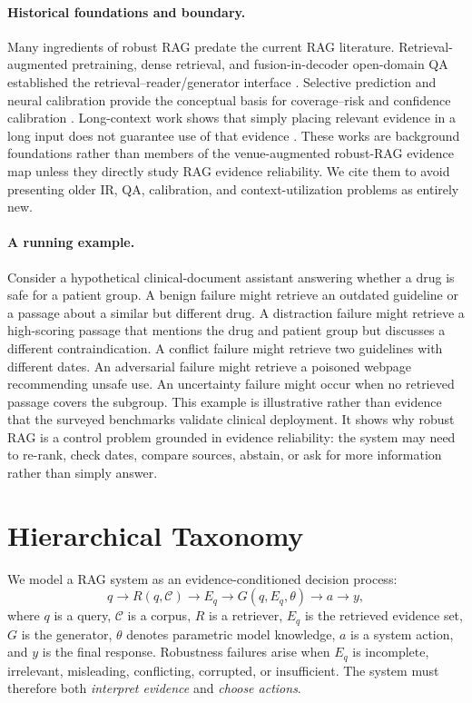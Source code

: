 \documentclass[11pt]{article}
\begin{document}
\paragraph{Historical foundations and boundary.}
Many ingredients of robust RAG predate the current RAG literature. Retrieval-augmented pretraining, dense retrieval, and fusion-in-decoder open-domain QA established the retrieval--reader/generator interface \citep{realm2020,dpr2020,fid2021}. Selective prediction and neural calibration provide the conceptual basis for coverage--risk and confidence calibration \citep{geifman2017selective,guo2017calibration}. Long-context work shows that simply placing relevant evidence in a long input does not guarantee use of that evidence \citep{liu2024lostmiddle}. These works are background foundations rather than members of the venue-augmented robust-RAG evidence map unless they directly study RAG evidence reliability. We cite them to avoid presenting older IR, QA, calibration, and context-utilization problems as entirely new.

\paragraph{A running example.}
Consider a hypothetical clinical-document assistant answering whether a drug is safe for a patient group. A benign failure might retrieve an outdated guideline or a passage about a similar but different drug. A distraction failure might retrieve a high-scoring passage that mentions the drug and patient group but discusses a different contraindication. A conflict failure might retrieve two guidelines with different dates. An adversarial failure might retrieve a poisoned webpage recommending unsafe use. An uncertainty failure might occur when no retrieved passage covers the subgroup. This example is illustrative rather than evidence that the surveyed benchmarks validate clinical deployment. It shows why robust RAG is a control problem grounded in evidence reliability: the system may need to re-rank, check dates, compare sources, abstain, or ask for more information rather than simply answer.

\section{Hierarchical Taxonomy}
\label{sec:taxonomy}



We model a RAG system as an evidence-conditioned decision process:
\[
q \rightarrow R(q, \mathcal{C}) \rightarrow E_q \rightarrow G(q, E_q, \theta) \rightarrow a \rightarrow y,
\]
where $q$ is a query, $\mathcal{C}$ is a corpus, $R$ is a retriever, $E_q$ is the retrieved evidence set, $G$ is the generator, $\theta$ denotes parametric model knowledge, $a$ is a system action, and $y$ is the final response. Robustness failures arise when $E_q$ is incomplete, irrelevant, misleading, conflicting, corrupted, or insufficient. The system must therefore both \emph{interpret evidence} and \emph{choose actions}.
\end{document}
